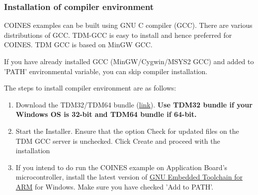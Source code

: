 \documentclass{article}
\begin{document}
\subsubsection{Installation of compiler environment}

COINES examples can be built using GNU C compiler (GCC). There are various distributions of GCC. TDM-GCC is easy to install and hence preferred for COINES. TDM GCC is based on MinGW GCC.

If you have already installed GCC (MinGW/Cygwin/MSYS2 GCC) and added to 'PATH' environmental variable, you can skip compiler installation.

The steps to install compiler environment are as follows:
\begin{enumerate}
	\item Download the TDM32/TDM64 bundle (\href{http://tdm-gcc.tdragon.net/}{link}). \textbf{Use TDM32 bundle if your Windows OS is 32-bit and TDM64 bundle if 64-bit.}
	\item Start the Installer. Ensure that the option Check for updated files on the TDM GCC server is unchecked. Click Create and proceed with the installation
	\item If you intend to do run the COINES example on Application Board's microcontroller, install the latest version of \href{https://developer.arm.com/downloads/-/arm-gnu-toolchain-downloads}{GNU Embedded Toolchain for ARM} for Windows. Make sure you have checked 'Add to PATH'.
\end{enumerate}
\end{document}
